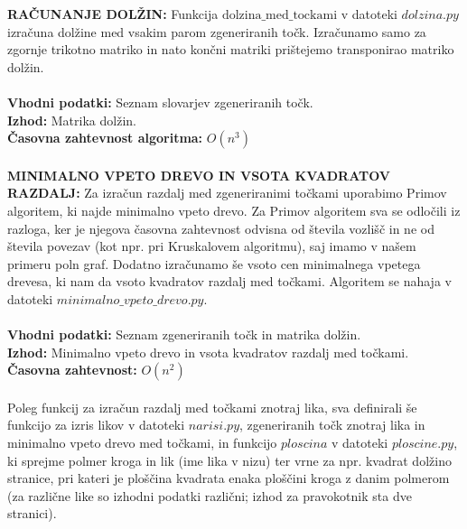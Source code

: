 \documentclass[a4paper]{article}
\begin{document}
\textbf{RAČUNANJE DOLŽIN: } Funkcija $\text{dolzina\_med\_tockami}$ v datoteki \colorbox{gray!10}{$dolzina.py$} izračuna dolžine med vsakim parom zgeneriranih točk. Izračunamo samo za zgornje trikotno matriko in nato končni matriki prištejemo transponirao matriko dolžin.\\ \\
\textbf{Vhodni podatki: } Seznam slovarjev zgeneriranih točk. \\
\textbf{Izhod:} Matrika dolžin. \\
\textbf{Časovna zahtevnost algoritma:} $O(n^3)$\\ \\
\textbf{MINIMALNO VPETO DREVO IN VSOTA KVADRATOV RAZDALJ: } Za izračun razdalj med zgeneriranimi točkami uporabimo Primov algoritem, ki najde minimalno vpeto drevo. Za Primov algoritem sva se odločili iz razloga, ker je njegova časovna zahtevnost odvisna od števila vozlišč in ne od števila povezav (kot npr. pri Kruskalovem algoritmu), saj imamo v našem primeru poln graf. Dodatno izračunamo še vsoto cen minimalnega vpetega drevesa, ki nam da vsoto kvadratov razdalj med točkami. Algoritem se nahaja v datoteki \colorbox{gray!10}{$minimalno\_vpeto\_drevo.py$}. \\ \\
\textbf{Vhodni podatki:} Seznam zgeneriranih točk in matrika dolžin. \\ 
\textbf{Izhod: } Minimalno vpeto drevo in vsota kvadratov razdalj med točkami. \\
\textbf{Časovna zahtevnost: } $O(n^2)$\\ \\
Poleg funkcij za izračun razdalj med točkami znotraj lika, sva definirali še funkcijo za izris likov v datoteki \colorbox{gray!10}{$narisi.py$}, zgeneriranih točk znotraj lika in minimalno vpeto drevo med točkami, in funkcijo $ploscina$ v datoteki \colorbox{gray!10}{$ploscine.py$}, ki sprejme polmer kroga in lik (ime lika v nizu) ter vrne za npr. kvadrat dolžino stranice, pri kateri je ploščina kvadrata enaka ploščini kroga z danim polmerom (za različne like so izhodni podatki različni; izhod za pravokotnik sta dve stranici). \\ \\
\end{document}
